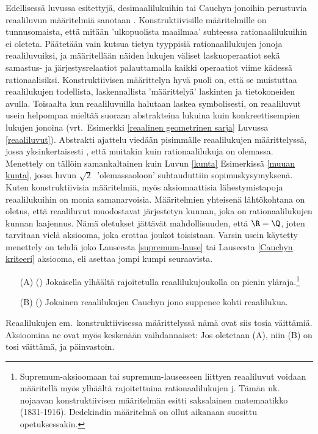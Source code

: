 Edellisessä luvussa esitettyjä, desimaalilukuihin tai Cauchyn jonoihin perustuvia reaaliluvun 
%
määritelmiä sanotaan . Konstruktiivisille määritelmille on 
tunnusomaista, että mitään 'ulkopuolista maailmaa' suhteessa rationaalilukuihin ei oleteta. 
Päätetään vain kutsua tietyn tyyppisiä rationaalilukujen jonoja reaaliluvuiksi, ja määritellään
näiden lukujen väliset laskuoperaatiot sekä samastus- ja järjestysrelaatiot palauttamalla kaikki
operaatiot viime kädessä rationaalisiksi. Konstruktiivisen määrittelyn hyvä puoli on, että se 
muistuttaa reaalilukujen todellista, laskennallista 'määrittelyä' laskinten ja tietokoneiden 
avulla. Toisaalta kun reaaliluvuilla halutaan laskea symbolisesti, on reaaliluvut usein 
helpompaa mieltää suoraan abstrakteina lukuina kuin konkreettisempien lukujen jonoina 
(vrt.\ Esimerkki \ref{reaalinen geometrinen sarja} Luvussa \ref{reaaliluvut}). Abstrakti
%
ajattelu viedään pisimmälle reaalilukujen  määrittelyssä, jossa
yksinkertaisesti , että muitakin kuin rationaalilukuja on olemassa. Menettely on
tällöin samankaltainen kuin Luvun \ref{kunta} Esimerkissä \ref{muuan kunta}, jossa luvun
$\sqrt{2}\ $  'olemassaoloon' suhtauduttiin sopimuskysymyksenä. Kuten konstruktiivisia
määritelmiä, myös aksiomaattisia lähestymistapoja reaalilukuihin on monia samanarvoisia.
Määritelmien yhteisenä lähtökohtana on oletus, että reaaliluvut muodostavat järjestetyn kunnan,
joka on rationaalilukujen kunnan laajennus. Nämä oletukset jättävät mahdollisuuden, että
$\R = \Q$, joten tarvitaan vielä aksiooma, joka erottaa joukot toisistaan. Varsin usein
käytetty menettely on tehdä joko Lauseesta \ref{supremum-lause} tai Lauseesta 
\ref{Cauchyn kriteeri} aksiooma, eli asettaa jompi kumpi seuraavista.
\begin{itemize}
\item[(A)] () Jokaisella ylhäältä rajoitetulla reaalilukujoukolla on 
           pienin yläraja.\footnote[2]{Supremum-aksioomaan tai supremum-lauseeseen liittyen
           reaaliluvut voidaan määritellä myös ylhäältä rajoitettuina rationaalilukujen
           j. Tämän nk.\  nojaavan konstruktiivisen
           määritelmän esitti saksalainen matemaatikko  (1831-1916).
           Dedekindin määritelmä on ollut aikanaan suosittu opetuksessakin.
            
           } 
\item[(B)] () Jokainen reaalilukujen Cauchyn jono suppenee kohti 
           reaalilukua.
\end{itemize}
Reaalilukujen em.\ konstruktiivisessa määrittelyssä nämä ovat siis tosia väittämiä. Aksioomina
ne ovat myös keskenään vaihdannaiset: Jos oletetaan (A), niin (B) on tosi väittämä, ja
päinvastoin.


